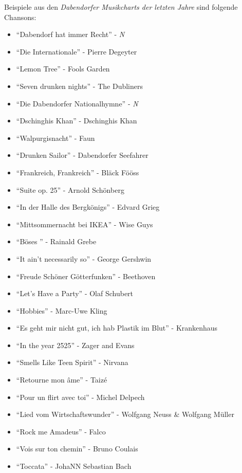Beispiele aus den \textit{Dabendorfer Musikcharts der letzten Jahre} sind folgende Chansons:
\begin{spacing}{0.5}
\begin{itemize}
\item \enquote{Dabendorf hat immer Recht} - \textit{N}
\item \enquote{Die Internationale} - Pierre Degeyter
\item \enquote{Lemon Tree} - Fools Garden
\item \enquote{Seven drunken nights} - The Dubliners
\item \enquote{Die Dabendorfer Nationalhymne} - \textit{N}
\item \enquote{Dschinghis Khan} - Dschinghis Khan
\item \enquote{Walpurgisnacht} - Faun
\item \enquote{Drunken Sailor} - Dabendorfer Seefahrer
\item \enquote{Frankreich, Frankreich} - Bläck Fööss
\item \enquote{Suite op. 25} - Arnold Schönberg
\item \enquote{In der Halle des Bergkönigs} - Edvard Grieg
\item \enquote{Mittsommernacht bei IKEA} - Wise Guys
\item \enquote{Böses } - Rainald Grebe
\item \enquote{It ain't necessarily so} - George Gershwin
\item \enquote{Freude Schöner Götterfunken} - Beethoven
\item \enquote{Let's Have a Party} - Olaf Schubert
\item \enquote{Hobbies} - Marc-Uwe Kling
\item \enquote{Es geht mir nicht gut, ich hab Plastik im Blut} - Krankenhaus
\item \enquote{In the year 2525} - Zager and Evans
\item \enquote{Smells Like Teen Spirit} - Nirvana
\item \enquote{Retourne mon âme} - Taizé
\item \enquote{Pour un flirt avec toi} - Michel Delpech
\item \enquote{Lied vom Wirtschaftswunder} - Wolfgang Neuss \& Wolfgang Müller
\item \enquote{Rock me Amadeus} - Falco
\item \enquote{Vois sur ton chemin} - Bruno Coulais
\item \enquote{Toccata} - JohaNN Sebastian Bach
\end{itemize}
\end{spacing}

